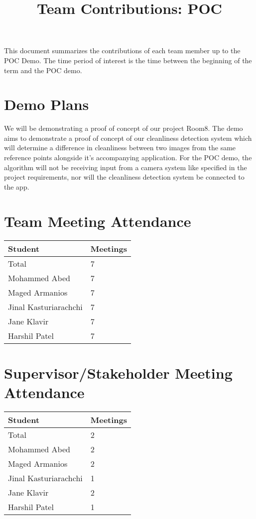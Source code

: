 \documentclass{article}
\title{Team Contributions: POC\\\progname}
\author{\authname}
\date{}
\begin{document}
\maketitle

This document summarizes the contributions of each team member up to the POC
Demo.  The time period of interest is the time between the beginning of the term
and the POC demo.

\section{Demo Plans}
We will be demonstrating a proof of concept of our project Room8. The demo aims to demonstrate a proof of concept of our cleanliness detection system which will determine a difference in cleanliness between two images from the same reference points alongside it's accompanying application. For the POC demo, the algorithm will not be receiving input from a camera system like specified in the project requirements, nor will the cleanliness detection system be connected to the app.

\section{Team Meeting Attendance}
\begin{table}[H]
\centering
\begin{tabular}{ll}
\toprule
\textbf{Student} & \textbf{Meetings}\\
\midrule
Total & 7\\
Mohammed Abed & 7\\
Maged Armanios & 7\\
Jinal Kasturiarachchi & 7\\
Jane Klavir & 7\\
Harshil Patel & 7\\
\bottomrule
\end{tabular}
\end{table}

\section{Supervisor/Stakeholder Meeting Attendance}

\begin{table}[H]
\centering
\begin{tabular}{ll}
\toprule
\textbf{Student} & \textbf{Meetings}\\
\midrule
Total & 2\\
Mohammed Abed & 2\\
Maged Armanios & 2\\
Jinal Kasturiarachchi & 1\\
Jane Klavir & 2\\
Harshil Patel & 1\\
\bottomrule
\end{tabular}
\end{table}
\end{document}
